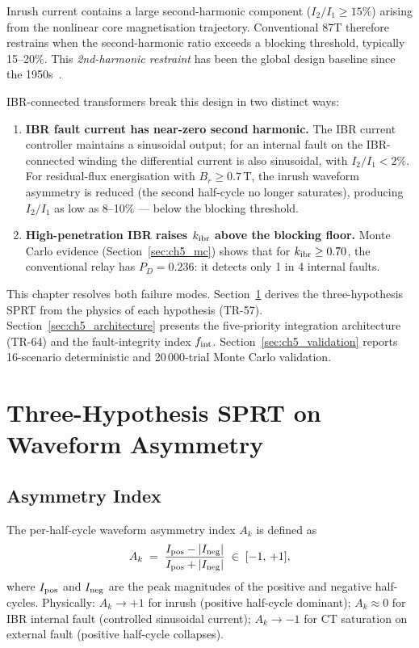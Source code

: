 Inrush current contains a large second-harmonic component ($I_2/I_1 \geq 15\%$)
arising from the nonlinear core magnetisation trajectory.
Conventional 87T therefore restrains when the second-harmonic ratio exceeds a
blocking threshold, typically 15--20\%.
This \emph{2nd-harmonic restraint} has been the global design baseline since the
1950s~\cite{Blackburn2006}.

IBR-connected transformers break this design in two distinct ways:

\begin{enumerate}
  \item \textbf{IBR fault current has near-zero second harmonic.}
    The IBR current controller maintains a sinusoidal output; for an internal
    fault on the IBR-connected winding the differential current is also
    sinusoidal, with $I_2/I_1 < 2\%$.
    For residual-flux energisation with $B_r \geq 0.7\,\text{T}$, the inrush
    waveform asymmetry is reduced (the second half-cycle no longer saturates),
    producing $I_2/I_1$ as low as 8--10\% — below the blocking threshold.

  \item \textbf{High-penetration IBR raises $k_{\rm ibr}$ above the blocking
    floor.}
    Monte Carlo evidence (Section~\ref{sec:ch5_mc}) shows that for
    $k_{\rm ibr} \geq 0.70$, the conventional relay has $P_D = 0.236$:
    it detects only 1 in 4 internal faults.
\end{enumerate}

This chapter resolves both failure modes.
Section~\ref{sec:ch5_sprt} derives the three-hypothesis SPRT from the physics
of each hypothesis (TR-57).
Section~\ref{sec:ch5_architecture} presents the five-priority integration
architecture (TR-64) and the fault-integrity index $f_{\rm int}$.
Section~\ref{sec:ch5_validation} reports 16-scenario deterministic and
20\,000-trial Monte Carlo validation.

\section{Three-Hypothesis SPRT on Waveform Asymmetry}
\label{sec:ch5_sprt}

\subsection{Asymmetry Index}
\label{sec:ch5_asymmetry}

The per-half-cycle waveform asymmetry index $A_k$ is defined as
\begin{equation}
  A_k \;=\; \frac{I_{\rm pos} - |I_{\rm neg}|}{I_{\rm pos} + |I_{\rm neg}|}
  \;\in\; [-1,\,+1],
  \label{eq:ch5_asymmetry}
\end{equation}
where $I_{\rm pos}$ and $I_{\rm neg}$ are the peak magnitudes of the positive
and negative half-cycles.
Physically: $A_k \to +1$ for inrush (positive half-cycle dominant);
$A_k \approx 0$ for IBR internal fault (controlled sinusoidal current);
$A_k \to -1$ for CT saturation on external fault (positive half-cycle collapses).

